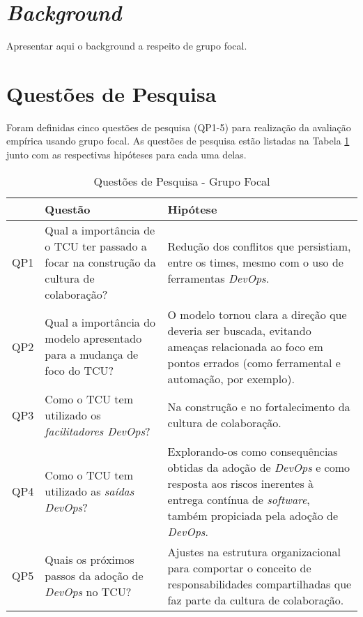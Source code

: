 \section{\textit{Background}}
Apresentar aqui o background a respeito de grupo focal.

\section{Questões de Pesquisa}
Foram definidas cinco questões de pesquisa (QP1-5) para realização da avaliação
empírica usando grupo focal. As questões de pesquisa estão listadas na Tabela
\ref{tabela_qp} junto com as respectivas hipóteses para cada uma delas.

\begin{table}[hb!]
\centering
\caption{Questões de Pesquisa - Grupo Focal}
\label{tabela_qp}
\begin{tabular}{|p{}|p{7cm}|p{7cm}|} \hline
    & \textbf{Questão}                                                                                    & \textbf{Hipótese}                                                                                                                                                                                                             \\
\hline
QP1 & Qual a importância de o \acrshort{TCU} ter passado a focar na construção da cultura de colaboração? & Redução dos conflitos que persistiam, entre os times, mesmo com o uso de ferramentas \textit{DevOps}. \\
\hline
QP2 & Qual a importância do modelo apresentado para a mudança de foco do \acrshort{TCU}?                  & O modelo tornou clara a direção que deveria ser buscada, evitando ameaças relacionada ao foco em pontos errados (como ferramental e automação, por exemplo). \\
\hline
QP3 & Como o \acrshort{TCU} tem utilizado os \emph{facilitadores DevOps}?                                 & Na construção e no fortalecimento da cultura de colaboração. \\
\hline
QP4 & Como o \acrshort{TCU} tem utilizado as \emph{saídas DevOps}?                                        & Explorando-os como consequências obtidas da adoção de \textit{DevOps} e como resposta aos riscos inerentes à entrega contínua de \textit{software}, também propiciada pela adoção de \textit{DevOps}. \\
\hline
QP5 & Quais os próximos passos da adoção de \textit{DevOps} no \acrshort{TCU}?                            & Ajustes na estrutura organizacional para comportar o conceito de responsabilidades compartilhadas que faz parte da cultura de colaboração. \\
\hline
\end{tabular}
\end{table}

